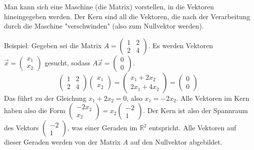 Man kann sich eine Maschine (die Matrix) vorstellen, in die Vektoren hineingegeben werden. Der Kern sind all die Vektoren, die nach der Verarbeitung durch die Maschine "verschwinden" (also zum Nullvektor werden).

Beispiel:
Gegeben sei die Matrix \(A = \begin{pmatrix} 1 & 2 \\ 2 & 4 \end{pmatrix}\). Es werden Vektoren \(\vec{x} = \begin{pmatrix} x_1 \\ x_2 \end{pmatrix}\) gesucht, sodass \(A\vec{x} = \begin{pmatrix} 0 \\ 0 \end{pmatrix}\).
\[ \begin{pmatrix} 1 & 2 \\ 2 & 4 \end{pmatrix} \begin{pmatrix} x_1 \\ x_2 \end{pmatrix} = \begin{pmatrix} x_1 + 2x_2 \\ 2x_1 + 4x_2 \end{pmatrix} = \begin{pmatrix} 0 \\ 0 \end{pmatrix} \]
Das führt zu der Gleichung \(x_1 + 2x_2 = 0\), also \(x_1 = -2x_2\).
Alle Vektoren im Kern haben also die Form \(\begin{pmatrix} -2x_2 \\ x_2 \end{pmatrix} = x_2 \begin{pmatrix} -2 \\ 1 \end{pmatrix}\).
Der Kern ist also der Spannraum des Vektors \(\begin{pmatrix} -2 \\ 1 \end{pmatrix}\), was einer Geraden im \(\mathbb{R}^2\) entspricht. Alle Vektoren auf dieser Geraden werden von der Matrix \(A\) auf den Nullvektor abgebildet.
